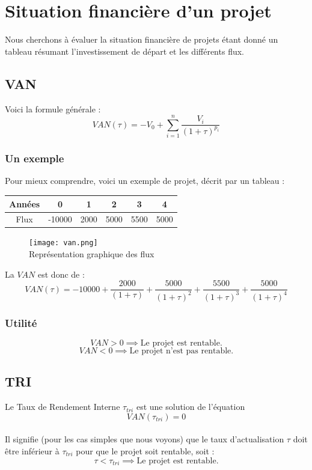 \documentclass{article}
\begin{document}
\section {Situation financière d'un projet}
Nous cherchons à évaluer la situation financière de projets étant donné un tableau résumant l'investissement de départ et les différents flux.
\subsection{VAN}
Voici la formule générale :
$$\boxed{VAN(\tau) = -V_0 + \sum_{i=1}^n \dfrac{V_i}{(1+\tau)^{p_i}}}$$

\subsubsection{Un exemple}
Pour mieux comprendre, voici un exemple de projet, décrit par un tableau : 
\begin{center}
\begin{tabular}{ |c|c|c|c|c|c| } 
 \hline
 Années & 0 & 1 & 2 & 3 & 4\\ \hline
 Flux & -10000 & 2000 & 5000 & 5500 & 5000\\ \hline
\end{tabular}
\end{center}

\begin{figure}[H]
    \centering
    \texttt{[image: van.png]}
    \\Représentation graphique des flux
\end{figure}

La $VAN$ est donc de :
$$VAN(\tau) = -10000 + \dfrac{2000}{(1+\tau)} + \dfrac{5000}{(1+\tau)^2} + \dfrac{5500}{(1+\tau)^3} + \dfrac{5000}{(1+\tau)^4}$$

\subsubsection{Utilité}
$$VAN > 0 \implies \text{Le projet est rentable.}$$
$$VAN < 0 \implies \text{Le projet n'est pas rentable.}$$

\subsection{TRI}
Le Taux de Rendement Interne $\tau_{tri}$ est une solution de l'équation 
$$VAN(\tau_{tri}) = 0$$
%
\\Il signifie (pour les cas simples que nous voyons) que le taux d'actualisation $\tau$ doit être inférieur à $\tau_{tri}$ pour que le projet soit rentable, soit :
$$\tau < \tau_{tri} \implies \text{Le projet est rentable.}$$
\end{document}
